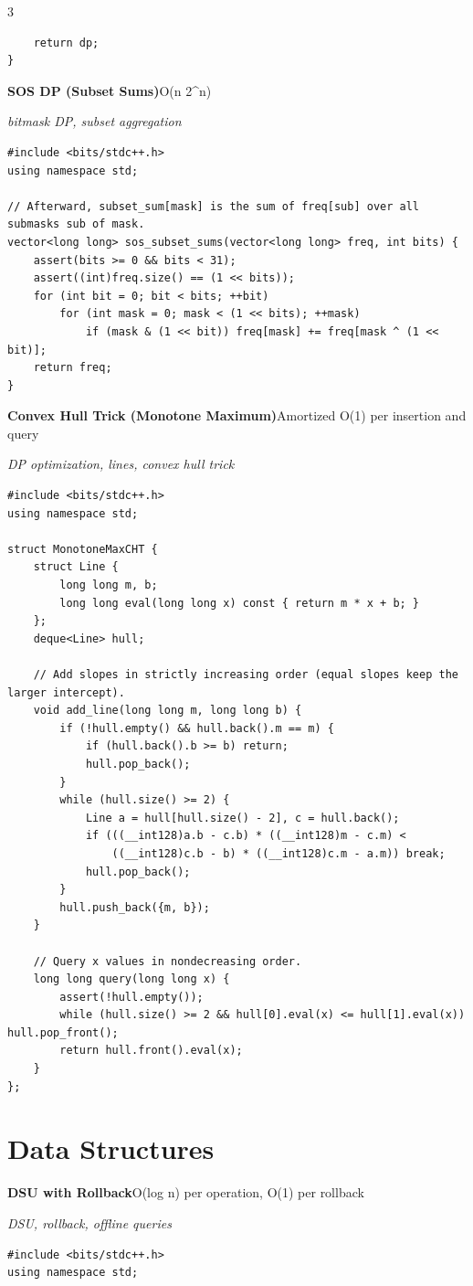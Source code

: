 \documentclass[8pt,a4paper,landscape]{article}
\begin{document}
\begin{multicols}{3}
\begin{lstlisting}
    return dp;
}
\end{lstlisting}
\vspace{1pt}
\textbf{SOS DP (Subset Sums)}\hfill{\scriptsize O(n 2\textasciicircum{}n)}\par
{\scriptsize\itshape bitmask DP, subset aggregation}\par
\begin{lstlisting}
#include <bits/stdc++.h>
using namespace std;

// Afterward, subset_sum[mask] is the sum of freq[sub] over all submasks sub of mask.
vector<long long> sos_subset_sums(vector<long long> freq, int bits) {
    assert(bits >= 0 && bits < 31);
    assert((int)freq.size() == (1 << bits));
    for (int bit = 0; bit < bits; ++bit)
        for (int mask = 0; mask < (1 << bits); ++mask)
            if (mask & (1 << bit)) freq[mask] += freq[mask ^ (1 << bit)];
    return freq;
}
\end{lstlisting}
\vspace{1pt}
\textbf{Convex Hull Trick (Monotone Maximum)}\hfill{\scriptsize Amortized O(1) per insertion and query}\par
{\scriptsize\itshape DP optimization, lines, convex hull trick}\par
\begin{lstlisting}
#include <bits/stdc++.h>
using namespace std;

struct MonotoneMaxCHT {
    struct Line {
        long long m, b;
        long long eval(long long x) const { return m * x + b; }
    };
    deque<Line> hull;

    // Add slopes in strictly increasing order (equal slopes keep the larger intercept).
    void add_line(long long m, long long b) {
        if (!hull.empty() && hull.back().m == m) {
            if (hull.back().b >= b) return;
            hull.pop_back();
        }
        while (hull.size() >= 2) {
            Line a = hull[hull.size() - 2], c = hull.back();
            if (((__int128)a.b - c.b) * ((__int128)m - c.m) <
                ((__int128)c.b - b) * ((__int128)c.m - a.m)) break;
            hull.pop_back();
        }
        hull.push_back({m, b});
    }

    // Query x values in nondecreasing order.
    long long query(long long x) {
        assert(!hull.empty());
        while (hull.size() >= 2 && hull[0].eval(x) <= hull[1].eval(x)) hull.pop_front();
        return hull.front().eval(x);
    }
};
\end{lstlisting}
\vspace{1pt}
\section*{Data Structures}
\textbf{DSU with Rollback}\hfill{\scriptsize O(log n) per operation, O(1) per rollback}\par
{\scriptsize\itshape DSU, rollback, offline queries}\par
\begin{lstlisting}
#include <bits/stdc++.h>
using namespace std;


\end{lstlisting}
\end{multicols}
\end{document}
